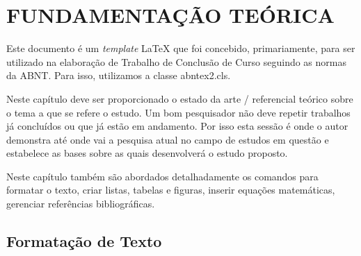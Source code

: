 
\chapter{FUNDAMENTAÇÃO TEÓRICA}
\label{chap:fundamentacaoTeorica}

Este documento é um \emph{template} \LaTeX{} que foi concebido, primariamente, para ser utilizado na elaboração de Trabalho de Conclusão de Curso seguindo as normas da ABNT. Para isso, utilizamos a classe {\ttfamily abntex2.cls}.

Neste capítulo deve ser proporcionado o estado da arte / referencial teórico sobre o tema a que se refere o estudo. Um bom pesquisador não deve repetir trabalhos já concluídos ou que já estão em andamento. Por isso esta sessão é onde o autor demonstra até onde vai a pesquisa atual no campo de estudos em questão e estabelece as bases sobre as quais desenvolverá o estudo proposto.

Neste capítulo também são abordados detalhadamente os comandos para formatar o texto, criar listas, tabelas e figuras, inserir equações matemáticas, gerenciar referências bibliográficas.

\section{Formatação de Texto}
\label{sec:formatacaoTexto}


